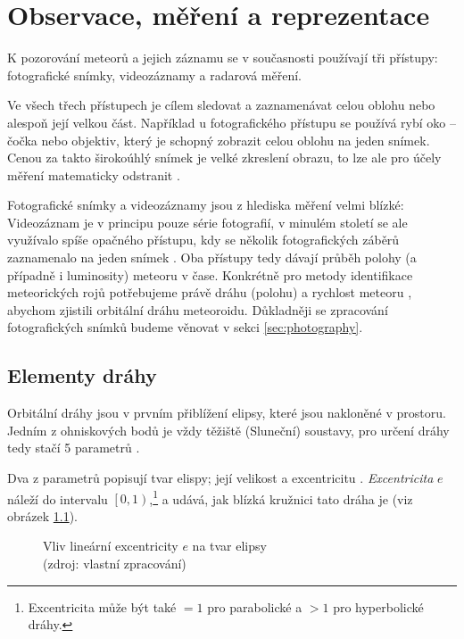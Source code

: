\chapter{Observace, měření a reprezentace}
K pozorování meteorů a jejich záznamu se v současnosti používají tři přístupy: fotografické snímky, videozáznamy a radarová měření.

Ve všech třech přístupech je cílem sledovat a zaznamenávat celou oblohu nebo alespoň její velkou část. Například u fotografického přístupu se používá rybí oko \cite{ceplecha} -- čočka nebo objektiv, který je schopný zobrazit celou oblohu na jeden snímek. Cenou za takto širokoúhlý snímek je velké zkreslení obrazu, to lze ale pro účely měření matematicky odstranit \cite{ceplecha}.


Fotografické snímky a videozáznamy jsou z hlediska měření velmi blízké: Videozáznam je v principu pouze série fotografií, v minulém století se ale využívalo spíše opačného přístupu, kdy se několik fotografických záběrů zaznamenalo na jeden snímek \cite{ceplecha}. Oba přístupy tedy dávají průběh polohy (a případně i luminosity) meteoru v čase. Konkrétně pro metody identifikace meteorických rojů potřebujeme právě dráhu (polohu) a rychlost meteoru \cite{ceplecha}, abychom zjistili orbitální dráhu meteoroidu. Důkladněji se zpracování fotografických snímků budeme věnovat v sekci \ref{sec:photography}.

\section{Elementy dráhy}\label{sec:orbit}
Orbitální dráhy jsou v prvním přiblížení elipsy, které jsou nakloněné v prostoru. Jedním z ohniskových bodů je vždy těžiště (Sluneční) soustavy, pro určení dráhy tedy stačí 5 parametrů \cite{astro}.

\medskip

Dva z parametrů popisují tvar elispy; její velikost a excentricitu \cite{astro}. \textit{Excentricita} $e$ náleží do intervalu $\left[0,1\right)$,\footnote{Excentricita může být také $=1$ pro parabolické a $>1$ pro hyperbolické dráhy. } a udává, jak blízká kružnici tato dráha je (viz obrázek \ref{img:orbit:eccentricity}).

\begin{figure}[ht]
    \centering
    \caption[Vliv lineární excentricity $e$ na tvar elipsy]{Vliv lineární excentricity $e$ na tvar elipsy\\{\small (zdroj: vlastní zpracování)}}
    \label{img:orbit:eccentricity}
\end{figure}

